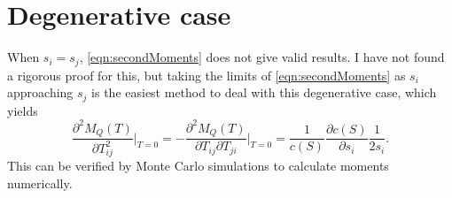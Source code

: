 \documentclass[10pt]{article}
\begin{document}
\section{Degenerative case}
When $s_i=s_j$, \eqref{eqn:secondMoments} does not give valid results.
I have not found a rigorous proof for this, but taking the limits of \eqref{eqn:secondMoments} as $s_i$ approaching $s_j$ is the easiest method to deal with this degenerative case, which yields
\begin{equation}
	\frac{\partial^2 M_Q(T)}{\partial T_{ij}^2}\bigg|_{T=0} = -\frac{\partial^2 M_Q(T)}{\partial T_{ij}\partial T_{ji}}\bigg|_{T=0} = \frac{1}{c(S)}\frac{\partial c(S)}{\partial s_i}\frac{1}{2s_i}.
\end{equation}
This can be verified by Monte Carlo simulations to calculate moments numerically.



\end{document}
